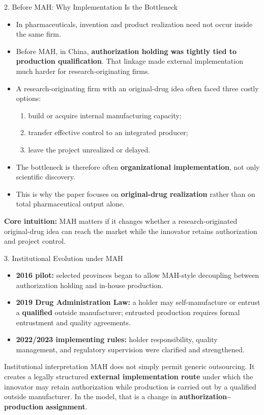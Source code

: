 \documentclass[aspectratio=169,11pt]{beamer}
\begin{document}
\begin{frame}{2. Before MAH: Why Implementation Is the Bottleneck}
\small
\begin{itemize}
\item In pharmaceuticals, invention and product realization need not occur inside the same firm.
\item Before MAH, in China, \textbf{authorization holding was tightly tied to production qualification}. That linkage made external implementation much harder for research-originating firms.
\item A research-originating firm with an original-drug idea often faced three costly options:
\begin{enumerate}
\item build or acquire internal manufacturing capacity;
\item transfer effective control to an integrated producer;
\item leave the project unrealized or delayed.
\end{enumerate}
\item The bottleneck is therefore often \textbf{organizational implementation}, not only scientific discovery.
\item This is why the paper focuses on \textbf{original-drug realization} rather than on total pharmaceutical output alone.
\end{itemize}

\vspace{0.15cm}
\textbf{Core intuition:} MAH matters if it changes whether a research-originated original-drug idea can reach the market while the innovator retains authorization and project control.
\end{frame}

\begin{frame}{3. Institutional Evolution under MAH}
\small
\begin{itemize}
\item \textbf{2016 pilot:} selected provinces began to allow MAH-style decoupling between authorization holding and in-house production.
\item \textbf{2019 Drug Administration Law:} a holder may self-manufacture or entrust a \textbf{qualified} outside manufacturer; entrusted production requires formal entrustment and quality agreements.
\item \textbf{2022/2023 implementing rules:} holder responsibility, quality management, and regulatory supervision were clarified and strengthened.
\end{itemize}

\vspace{0.2cm}
\begin{block}{Institutional interpretation}
MAH does not simply permit generic outsourcing. It creates a legally structured \textbf{external implementation route} under which the innovator may retain authorization while production is carried out by a qualified outside manufacturer. In the model, that is a change in \textbf{authorization--production assignment}.
\end{block}
\end{frame}
\end{document}
